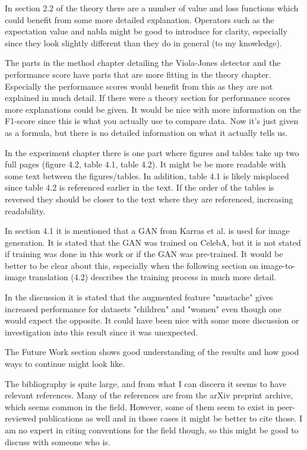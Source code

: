 \documentclass[11pt,a4paper]{article}
\begin{document}
	In section 2.2 of the theory there are a number of value and loss functions which could benefit from some more detailed explanation. Operators such as the expectation value and nabla might be good to introduce for clarity, especially since they look slightly different than they do in general (to my knowledge).
	
	The parts in the method chapter detailing the Viola-Jones detector and the performance score have parts that are more fitting in the theory chapter. Especially the performance scores would benefit from this as they are not explained in much detail. If there were a theory section for performance scores more explanations could be given. It would be nice with more information on the F1-score since this is what you actually use to compare data. Now it’s just given as a formula, but there is no detailed information on what it actually tells us.
	
	In the experiment chapter there is one part where figures and tables take up two full pages (figure 4.2, table 4.1, table 4.2). It might be be more readable with some text between the figures/tables. In addition, table 4.1 is likely misplaced since table 4.2 is referenced earlier in the text. If the order of the tables is reversed they should be closer to the text where they are referenced, increasing readability.
	
	In section 4.1 it is mentioned that a GAN from Karras et al. is used for image generation. It is stated that the GAN was trained on CelebA, but it is not stated if training was done in this work or if the GAN was pre-trained. It would be better to be clear about this, especially when the following section on image-to-image translation (4.2) describes the training process in much more detail.
	
	In the discussion it is stated that the augmented feature "mustache" gives increased performance for datasets "children" and "women" even though one would expect the opposite. It could have been nice with some more discussion or investigation into this result since it was unexpected.
	
	The Future Work section shows good understanding of the results and how good ways to continue might look like.
	
	The bibliography is quite large, and from what I can discern it seems to have relevant references. Many of the references are from the arXiv preprint archive, which seems common in the field. However, some of them seem to exist in peer-reviewed publications as well and in those cases it might be better to cite those. I am no expert in citing conventions for the field though, so this might be good to discuss with someone who is.
	
\end{document}
